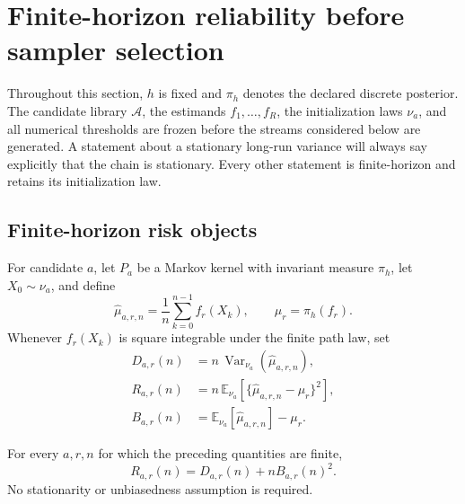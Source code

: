 
\section{Finite-horizon reliability before sampler selection}
\label{sec:stage2-mathematical-core}

Throughout this section, \(h\) is fixed and \(\pi_h\) denotes the declared
discrete posterior.  The candidate library \(\mathcal A\), the estimands
\(f_1,\ldots,f_R\), the initialization laws \(\nu_a\), and all numerical
thresholds are frozen before the streams considered below are generated.  A
statement about a stationary long-run variance will always say explicitly
that the chain is stationary.  Every other statement is finite-horizon and
retains its initialization law.

\subsection{Finite-horizon risk objects}
\label{subsec:stage2-risk}

For candidate \(a\), let \(P_a\) be a Markov kernel with invariant measure
\(\pi_h\), let \(X_0\sim\nu_a\), and define
\begin{equation}
 \widehat\mu_{a,r,n}
 =
 \frac1n\sum_{k=0}^{n-1} f_r(X_k),
 \qquad
 \mu_r=\pi_h(f_r).
 \label{eq:s2-estimator}
\end{equation}
Whenever \(f_r(X_k)\) is square integrable under the finite path law, set
\begin{align}
 D_{a,r}(n)
 &=
 n\,\operatorname{Var}_{\nu_a}(\widehat\mu_{a,r,n}),
 \label{eq:s2-dispersion}\\
 R_{a,r}(n)
 &=
 n\,\mathbb E_{\nu_a}
 \left[
  \{\widehat\mu_{a,r,n}-\mu_r\}^2
 \right],
 \label{eq:s2-risk}\\
 B_{a,r}(n)
 &=
 \mathbb E_{\nu_a}[\widehat\mu_{a,r,n}]-\mu_r.
 \label{eq:s2-bias}
\end{align}

\begin{proposition}
\label{prop:s2-bias-variance}
For every \(a,r,n\) for which the preceding quantities are finite,
\begin{equation}
 R_{a,r}(n)
 =
 D_{a,r}(n)+nB_{a,r}(n)^2.
 \label{eq:s2-bias-variance}
\end{equation}
No stationarity or unbiasedness assumption is required.
\end{proposition}

